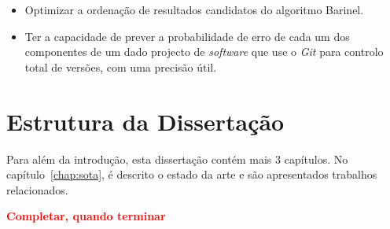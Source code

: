 \begin{itemize}
\item Optimizar a ordenação de resultados candidatos do algoritmo Barinel.
\item Ter a capacidade de prever a probabilidade de erro de cada um dos componentes de um dado projecto de \emph{software} que use o \emph{Git} para controlo total de versões, com uma precisão útil.
\end{itemize}

\section{Estrutura da Dissertação} \label{sec:struct}

Para além da introdução, esta dissertação contém mais 3 capítulos.
No capítulo~\ref{chap:sota}, é descrito o estado da arte e são
apresentados trabalhos relacionados. 

\textbf{\textcolor{red}{Completar, quando terminar} }
